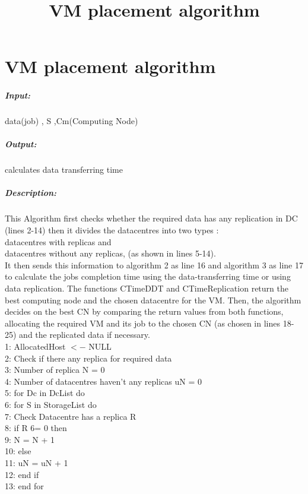 \documentclass[12pt,a4paper]{report}
\begin{document}
\section{VM placement algorithm} 
\title{VM placement algorithm}
\subparagraph*{Input:} data(job) , S ,Cm(Computing Node)
\subparagraph*{Output:} calculates data transferring time
\subparagraph*{Description:} This Algorithm first checks whether the required data has any replication in DC (lines 2-14) then it divides the datacentres into two types :\\
 datacentres with replicas and \\
datacentres without any replicas, (as shown in lines 5-14).\\
It then sends this information to algorithm 2 as line 16 and algorithm 3 as line 17 to calculate the jobs completion time using the data-transferring time or using data replication. The functions CTimeDDT and CTimeReplication return the best computing node and the chosen datacentre for the VM. Then, the algorithm decides on the best CN by comparing the return values from both functions, allocating the required VM and its job to the chosen CN (as chosen in lines 18-25) and the replicated data if necessary. \\
1: AllocatedHost $<-$ NULL \\
2: Check if there any replica for required data \\
3: Number of replica N = 0\\
 4: Number of datacentres haven’t any replicas uN = 0\\
 5: for Dc in DcList do \\
6:\hspace{0.1 in}  for S in StorageList do\\
 7: \hspace{0.2 in}Check Datacentre has a replica R \\
8:\hspace{0.2 in} if R 6= 0 then \\
9:\hspace{0.3 in} N = N + 1 \\
10: \hspace{0.2 in}else \\
11:\hspace{0.3 in} uN = uN + 1 \\
12:\hspace{0.2 in} end if \\
13:\hspace{0.1 in} end for \\
\end{document}
